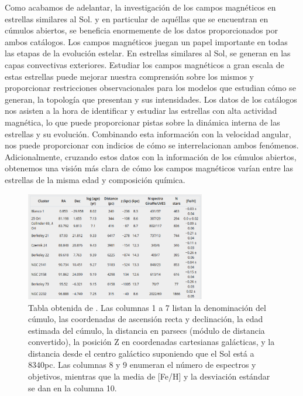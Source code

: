 Como acabamos de adelantar, la investigación de los campos magnéticos en estrellas similares al Sol. y en particular de aquéllas que se encuentran en cúmulos abiertos, se beneficia enormemente de los datos proporcionados por ambos catálogos. Los campos magnéticos juegan un papel importante en todas las etapas de la evolución estelar. En estrellas similares al Sol, se generan en las capas convectivas exteriores. Estudiar los campos magnéticos a gran escala de estas estrellas puede mejorar nuestra comprensión sobre los mismos y proporcionar restricciones observacionales para los modelos que estudian cómo se generan, la topología que presentan y sus intensidades. Los datos de los catálogos nos asisten a la hora de identificar y estudiar las estrellas con alta actividad magnética, lo que puede proporcionar pistas sobre la dinámica interna de las estrellas y su evolución. Combinando esta información con la velocidad angular, nos puede proporcionar con indicios de cómo se interrelacionan ambos fenómenos. Adicionalmente, cruzando estos datos con la información de los cúmulos abiertos, obtenemos una visión más clara de cómo los campos magnéticos varían entre las estrellas de la misma edad y composición química.\par

\begin{figure}
	\centering
	\includegraphics[width=0.7\textwidth]{img/tesis/open_cluster_sample.pdf}
	\caption{Tabla obtenida de \cite{Bragaglia2022}. Las columnas 1 a 7 listan la denominación del cúmulo, las coordenadas de ascensión recta y declinación, la edad estimada del cúmulo, la distancia en parsecs (módulo de distancia convertido), la posición Z en coordenadas cartesianas galácticas, y la distancia desde el centro galáctico suponiendo que el Sol está a 8340pc. Las columnas 8 y 9 enumeran el número de espectros y objetivos, mientras que la media de [Fe/H] y la desviación estándar se dan en la columna 10.}
	\label{fig:open_cluster_sample}
\end{figure}




